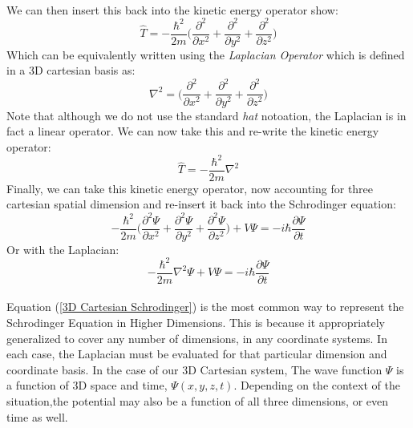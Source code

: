 \documentclass[12pt,letterpaper]{book}
\begin{document}
\paragraph*{}We can then insert this back into the kinetic energy operator show:
\begin{equation}
\hat{T} = -\frac{\hbar^2}{2m} \bigg( \frac{\partial^2}{\partial x^2} + \frac{\partial^2}{\partial y^2} + \frac{\partial^2}{\partial z^2} \bigg)
\end{equation}
Which can be equivalently written using the \textit{Laplacian Operator} which is defined in a 3D cartesian basis as:
\begin{equation}
\label{3D Cartesian Laplacian}
\nabla^2 = 
\bigg( \frac{\partial^2}{\partial x^2} + \frac{\partial^2}{\partial y^2} + \frac{\partial^2}{\partial z^2} \bigg)
\end{equation}
Note that although we do not use the standard \textit{hat} notoation, the Laplacian is in fact a linear operator. We can now take this and re-write the kinetic energy operator:
\begin{equation}
\hat{T} = -\frac{\hbar^2}{2m}\nabla^2
\end{equation}
Finally, we can take this kinetic energy operator, now accounting for three cartesian spatial dimension and re-insert it back into the Schrodinger equation:
\begin{equation}
-\frac{\hbar^2}{2m} \bigg( 
\frac{\partial^2 \Psi}{\partial x^2} + 
\frac{\partial^2 \Psi}{\partial y^2} + 
\frac{\partial^2 \Psi}{\partial z^2} \bigg) +
V\Psi = 
-i\hbar\frac{\partial \Psi}{\partial t}
\end{equation}
Or with the Laplacian:
\begin{equation}
\label{3D Schrodinger}
-\frac{\hbar^2}{2m}\nabla^2\Psi + V\Psi = 
-i\hbar\frac{\partial \Psi}{\partial t}
\end{equation}
\paragraph*{}Equation (\ref{3D Cartesian Schrodinger}) is the most common way to represent the Schrodinger Equation in Higher Dimensions. This is because it appropriately generalized to cover any number of dimensions, in any coordinate systems. In each case, the Laplacian must be evaluated for that particular dimension and coordinate basis. In the case of our 3D Cartesian system, The wave function $\Psi$ is a function of 3D space and time, $\Psi(x,y,z,t)$. Depending on the context of the situation,the potential may also be a function of all three dimensions, or even time as well. 
\end{document}
